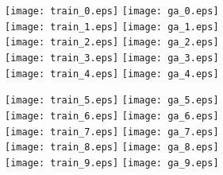 \documentclass[a4paper,portrait]{article}
\begin{document}
\begin{figure}
  \texttt{[image: train\_0.eps]}  \texttt{[image: ga\_0.eps]} \\
  \texttt{[image: train\_1.eps]}  \texttt{[image: ga\_1.eps]} \\
  \texttt{[image: train\_2.eps]}  \texttt{[image: ga\_2.eps]} \\
  \texttt{[image: train\_3.eps]}  \texttt{[image: ga\_3.eps]} \\
  \texttt{[image: train\_4.eps]}  \texttt{[image: ga\_4.eps]} 
\end{figure} 

\begin{figure}
  \texttt{[image: train\_5.eps]}  \texttt{[image: ga\_5.eps]} \\
  \texttt{[image: train\_6.eps]}  \texttt{[image: ga\_6.eps]} \\
  \texttt{[image: train\_7.eps]}  \texttt{[image: ga\_7.eps]} \\
  \texttt{[image: train\_8.eps]}  \texttt{[image: ga\_8.eps]} \\
  \texttt{[image: train\_9.eps]}  \texttt{[image: ga\_9.eps]} 
\end{figure} 
\end{document}
